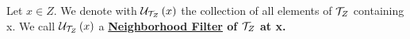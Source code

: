 \label{def:NeighborhoodFilter}   
\newcommand{\NeighborhoodFilter}[0]{
    \bf \hyperref[def:NeighborhoodFilter]{Neighborhood Filter} \rm
}
\newcommand{\NeighborhoodFilters}[0]{
    \bf \hyperref[def:NeighborhoodFilter]{Neighborhood Filters} \rm
}
\newcommand{\NbhFilter}[2]{
    \scU_{#1}\pa{#2}
}
\begin{df}
    Let $x \in Z$. 
    We denote with $\NbhFilter{\Topology{Z}{\T}}{x}$ the collection of all elements of $\mathcal{T}_Z$ containing x. 
    We call $\NbhFilter{\Topology{Z}{\T}}{x}$ a \NeighborhoodFilter  of $\mathcal{T}_Z$ at x. 
\end{df}

